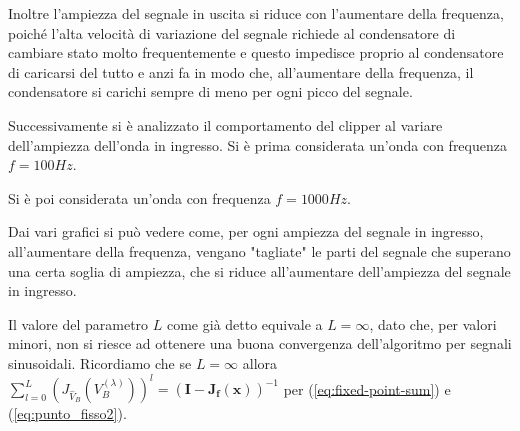 				Inoltre l'ampiezza del segnale in uscita si riduce con l'aumentare della frequenza, poiché l'alta velocità di variazione del segnale richiede al condensatore di cambiare stato molto frequentemente e questo impedisce proprio al condensatore di caricarsi del tutto e anzi fa in modo che, all'aumentare della frequenza, il condensatore si carichi sempre di meno per ogni picco del segnale.
				\pagebreak
				
				Successivamente si è analizzato il comportamento del clipper al variare dell'ampiezza dell'onda in ingresso.
				Si è prima considerata un'onda con frequenza $f = 100Hz$.
				\graficospace
				\graficospace
				\graficospace
				\graficospace
				\graficospace
				\pagebreak
				
				Si è poi considerata un'onda con frequenza $f = 1000Hz$.
				\graficospace
				\graficospace
				\graficospace
				\graficospace
				\graficospace
				\pagebreak
				
				Dai vari grafici si può vedere come, per ogni ampiezza del segnale in ingresso, all'aumentare della frequenza, vengano "tagliate" le parti del segnale che superano una certa soglia di ampiezza, che si riduce all'aumentare dell'ampiezza del segnale in ingresso.
				
				Il valore del parametro $L$ come già detto equivale a $L = \infty$, dato che, per valori minori, non si riesce ad ottenere una buona convergenza dell'algoritmo per segnali sinusoidali. Ricordiamo che se $L = \infty$ allora $\sum_{l=0}^{L} \left(J_{\widehat V_{B}}(V_{B}^{(\lambda)})\right)^{l} = (\mathbf{I}-\mathbf{J_{f}(x)})^{-1}$ per (\ref{eq:fixed-point-sum}) e (\ref{eq:punto_fisso2}).
				
